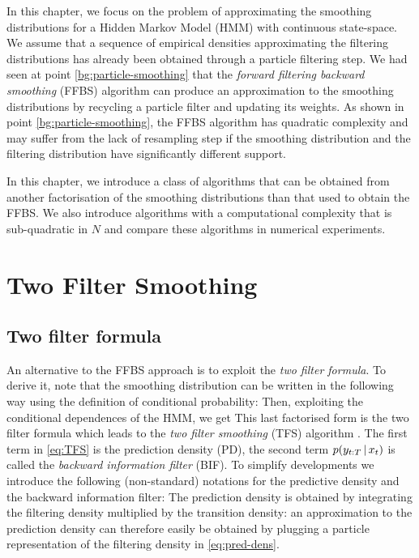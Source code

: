 
In this chapter, we focus on the problem of approximating the smoothing distributions for a Hidden Markov Model (HMM) with continuous state-space.
We assume that a sequence of empirical densities approximating the filtering distributions has already been obtained through a particle filtering step.
We had seen at point \ref{bg:particle-smoothing} that the \emph{forward filtering backward smoothing} (FFBS) algorithm can produce an approximation to the smoothing distributions by recycling a particle filter and updating its weights.  As shown in point \ref{bg:particle-smoothing}, the FFBS algorithm has quadratic complexity and may suffer from the lack of resampling step if the smoothing distribution and the filtering distribution have significantly different support. 

In this chapter, we introduce a class of algorithms that can be obtained from another factorisation of the smoothing distributions than that used to obtain the FFBS. We also introduce algorithms with a computational complexity that is sub-quadratic in $N$ and compare these algorithms in numerical experiments.

\section{\label{sec:TFS}Two Filter Smoothing}


\subsection{\label{point:TFS}Two filter formula}
An alternative to the FFBS approach is to exploit the \emph{two filter formula}. 
To derive it, note that the smoothing distribution can be written in the following way using the definition of conditional probability:
%
% 
Then, exploiting the conditional dependences of the HMM, we get
%
%
This last factorised form is the two filter formula which leads to the \emph{two filter smoothing} (TFS) algorithm \citep{bresler86, kitagawa96}. 
The first term in \eqref{eq:TFS} is the prediction density (PD), 
the second term $p(y_{t:T}\,|\, x_{t})$ is called the \emph{backward information filter} (BIF). To simplify developments we introduce the following (non-standard) notations for the predictive density and the backward information filter:
%
%
The prediction density is obtained by integrating the filtering density multiplied by the transition density:
%
%
an approximation to the prediction density can therefore easily be obtained by plugging a particle representation of the filtering density in \eqref{eq:pred-dens}. 
